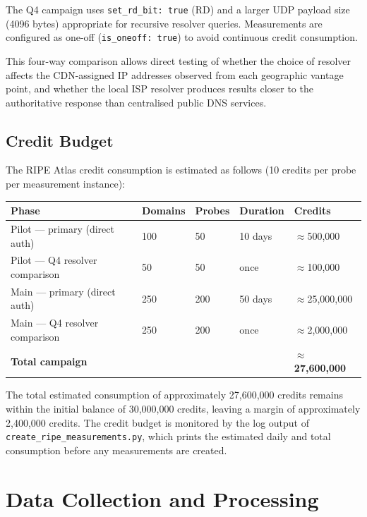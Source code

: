 The Q4 campaign uses \texttt{set\_rd\_bit: true} (\ac{RD}) and a larger \ac{UDP} payload size (4096 bytes) appropriate for recursive resolver queries. Measurements are configured as one-off (\texttt{is\_oneoff: true}) to avoid continuous credit consumption.

This four-way comparison allows direct testing of whether the choice of resolver affects the \ac{CDN}-assigned \ac{IP} addresses observed from each geographic vantage point, and whether the local \ac{ISP} resolver produces results closer to the authoritative response than centralised public \ac{DNS} services.

\subsection{Credit Budget}
\label{subsec:3.3.4}

The RIPE Atlas credit consumption is estimated as follows (10 credits per probe per measurement instance):

\begin{table}[H]
\centering
\small
\begin{tabular}{l l l l l}
\toprule
\textbf{Phase} & \textbf{Domains} & \textbf{Probes} & \textbf{Duration} & \textbf{Credits} \\
\midrule
Pilot — primary (direct auth)       & 100 &  50 & 10 days  & $\approx$500,000 \\
Pilot — Q4 resolver comparison      &  50 &  50 & once     & $\approx$100,000 \\
Main — primary (direct auth)        & 250 & 200 & 50 days  & $\approx$25,000,000 \\
Main — Q4 resolver comparison       & 250 & 200 & once     & $\approx$2,000,000 \\
\textbf{Total campaign}             &     &     &          & $\approx$\textbf{27,600,000} \\
\bottomrule
\end{tabular}
\end{table}

The total estimated consumption of approximately 27,600,000 credits remains within the initial balance of 30,000,000 credits, leaving a margin of approximately 2,400,000 credits. The credit budget is monitored by the log output of \texttt{create\_ripe\_measurements.py}, which prints the estimated daily and total consumption before any measurements are created.

\section{Data Collection and Processing}
\label{sec:3.4}

